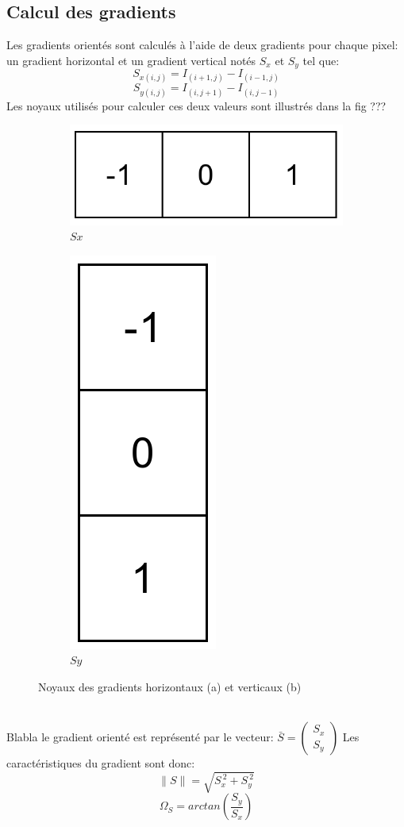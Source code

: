\documentclass[11pt]{article}
\begin{document}
\subsection{Calcul des gradients}
Les gradients orientés sont calculés à l'aide de deux gradients pour chaque pixel: un gradient horizontal et un gradient vertical notés $S_{x}$ et $S_{y}$ tel que:
\[S_{x(i,j)}=I_{(i+1,j)}-I_{(i-1,j)}\]
\[S_{y(i,j)}=I_{(i,j+1)}-I_{(i,j-1)}\]
Les noyaux utilisés pour calculer ces deux valeurs sont illustrés dans la fig ???
\\
\begin{figure}[!ht]
\centering
\begin{subfigure}{.3\textwidth}
  \centering
  \includegraphics[width=.6\linewidth]{Sx.png}
  \caption{$Sx$}
  \label{fig:kernel_sx}
\end{subfigure}%
\begin{subfigure}{.3\textwidth}
  \centering
  \includegraphics[width=.2\linewidth]{Sy.png}
  \caption{$Sy$}
  \label{fig:kernel_sy}
\end{subfigure}
\caption{Noyaux des gradients horizontaux (a) et verticaux (b)}
\label{fig:kernels}
\end{figure}
\\
Blabla le gradient orienté est représenté par le vecteur: 
$\bar{S}=\begin{pmatrix}S_{x}\\S_{y}\end{pmatrix}$
Les caractéristiques du gradient sont donc:\\
\[\|S\|=\sqrt{S_{x}^{~2}+S_{y}^{~2}}\]
\[\Omega_{S} = arctan(\frac{S_{y}}{S_{x}})\]
\end{document}
